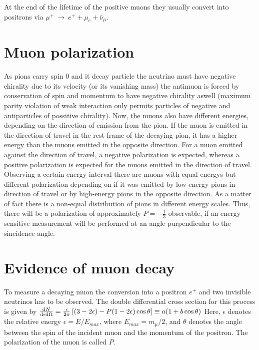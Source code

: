 \documentclass{include/thesisclass3}
\newcommand{\df}{\rightarrow}
\newcommand{\eps}{\epsilon}
\begin{document}
At the end of the lifetime of the positive muons they usually convert into positrons via $\mu^+ ~\df~e^+ + \mu_e + \bar{\nu}_\mu$. 
\section{Muon polarization}
As pions carry spin $0$ and it decay particle the neutrino must have negative chirality due to its velocity (or its vanishing mass) the antimuon is forced by conservation of spin and momentum to have negative chirality aswell (maximum parity violation of weak interaction only permits particles of negative and antiparticles of possitive chirality).
Now, the muons also have different energies, depending on the direction of emission from the pion.
If the muon is emitted in the direction of travel in the rest frame of the decaying pion, it has a higher energy than the muons emitted in the opposite direction. For a muon emitted against the direction of travel, a negative polarization is expected, whereas a positive polarization is expected for the muons emitted in the direction of travel.
Observing a certain energy interval there are muons with equal energys but different polarization depending on if it was emitted by low-energy pions in direction of travel or by high-energy pions in the opposite direction. As a matter of fact there is a non-equal distribution of pions in different energy scales. Thus, there will be a polarization of approximately $P=-\frac{1}{3}$ observable, if an energy sensitive measurement will be performed at an angle purpendicular to the sincidence angle.

\section{Evidence of muon decay}
To measure a decaying muon the conversion into a positron $e^+$ and two invisible neutrinos has to be observed.
The double differential cross section for this process is given by
$ \frac{\d N}{\d \eps \d \Omega} = \frac{\eps}{2\pi} \left[ (3-2\eps) - P(1-2\eps)\cos\theta\right] \equiv a(1 + b \cos\theta) $
Here, $\eps$ denotes the relative energy $\eps = E/E_{max}$, where $E_{max} = m_\mu/2$, and $\theta$ denotes the angle between the spin of the incident muon and the momentum of the positron. 
The polarization of the muon is called $P$.
\end{document}
